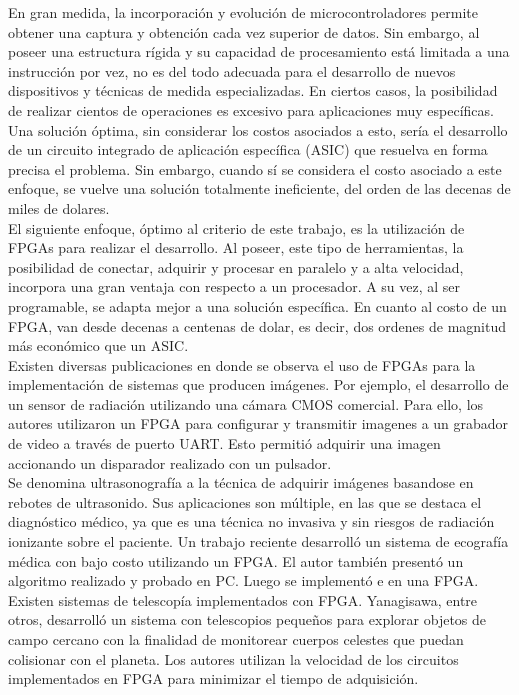 En gran medida, la incorporación y evolución de microcontroladores permite obtener una captura y obtención cada vez superior de datos. Sin embargo, al poseer una estructura rígida y su capacidad de procesamiento está limitada a una instrucción por vez, no es del todo adecuada para el desarrollo de nuevos dispositivos y técnicas de medida especializadas. En ciertos casos, la posibilidad de realizar cientos de operaciones es excesivo para aplicaciones muy específicas. Una solución óptima, sin considerar los costos asociados a esto, sería el desarrollo de un circuito integrado de aplicación específica (ASIC) que resuelva en forma precisa el problema. Sin embargo, cuando sí se considera el costo asociado a este enfoque, se vuelve una solución totalmente ineficiente, del orden de las decenas de miles de dolares.\\

El siguiente enfoque, óptimo al criterio de este trabajo, es la utilización de FPGAs para realizar el desarrollo. Al poseer, este tipo de herramientas, la posibilidad de conectar, adquirir y procesar en paralelo y a alta velocidad, incorpora una gran ventaja con respecto a un procesador. A su vez, al ser programable, se adapta mejor a una solución específica. En cuanto al costo de un FPGA, van desde decenas a centenas de dolar, es decir, dos ordenes de magnitud más económico que un ASIC.\\

Existen diversas publicaciones en donde se observa el uso de FPGAs para la implementación de sistemas que producen imágenes. Por ejemplo, el desarrollo de un sensor de radiación utilizando una cámara CMOS comercial. Para ello, los autores utilizaron un FPGA para configurar y transmitir imagenes a un grabador de video a través de puerto UART. Esto permitió adquirir una imagen accionando un disparador realizado con un pulsador\cite{Perez2017}.\\

Se denomina ultrasonografía a la técnica de adquirir imágenes basandose en rebotes de ultrasonido. Sus aplicaciones son múltiple, en las que se destaca el diagnóstico médico, ya que es una técnica no invasiva y sin riesgos de radiación ionizante sobre el paciente. Un trabajo reciente desarrolló un sistema de ecografía médica con bajo costo utilizando un FPGA\cite{biswas2018embedded}. El autor también presentó un algoritmo realizado y probado en PC. Luego se implementó e en una FPGA.\\

Existen sistemas de telescopía implementados con FPGA. Yanagisawa, entre otros, desarrolló un sistema con telescopios pequeños para explorar objetos de campo cercano con la finalidad de monitorear cuerpos celestes que puedan colisionar con el planeta\cite{Yanagisawa2018}. Los autores utilizan la velocidad de los circuitos implementados en FPGA para minimizar el tiempo de adquisición.

